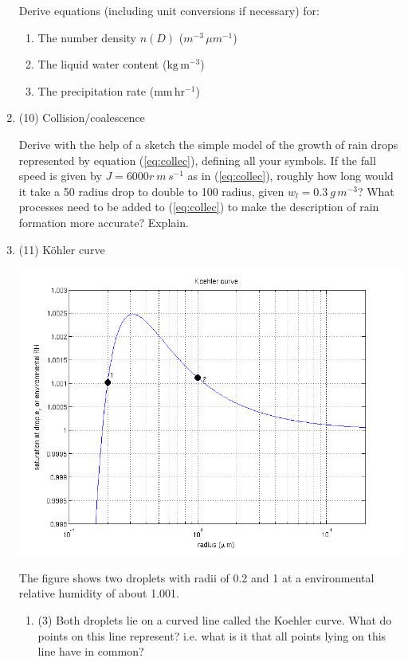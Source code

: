 \documentclass[12pt]{article}
\begin{document}
\begin{enumerate}
Derive equations (including unit conversions if necessary) for:

\begin{enumerate}
\item The number density $n(D)$ ($m^{-3}\,\mu m^{-1}$)
\item The liquid water content ($\mathrm{kg\,m^{-3}}$)
\item The precipitation rate ($\mathrm{mm\,hr^{-1}}$)
\end{enumerate}


\item (10) Collision/coalescence

   Derive with the help of a sketch the simple model of the growth of rain drops represented by
   equation (\ref{eq:collec}), defining all your symbols.  If the fall speed is given by $J= 6000r \ m\,s^{-1}$ as in (\ref{eq:collec}), roughly how long would it take a 50 \mum radius drop to double to 100 \mum radius, given $w_l = 0.3\ g\,m^{-3}$?  What processes need to be added to
    (\ref{eq:collec}) to make the description of rain formation more
    accurate? Explain.


\item (11) K\"ohler curve

\includegraphics[width=\textwidth]{m18.png}

The figure shows two droplets with radii of 0.2 \mum and
1 \mum at a environmental relative humidity of about 1.001.

\begin{enumerate}
\item (3) Both droplets lie on a curved line called the Koehler curve.  What
do points on this line represent?  i.e.  what is it that all points lying on
this line have in common?



\end{enumerate}
\end{enumerate}
\end{document}
